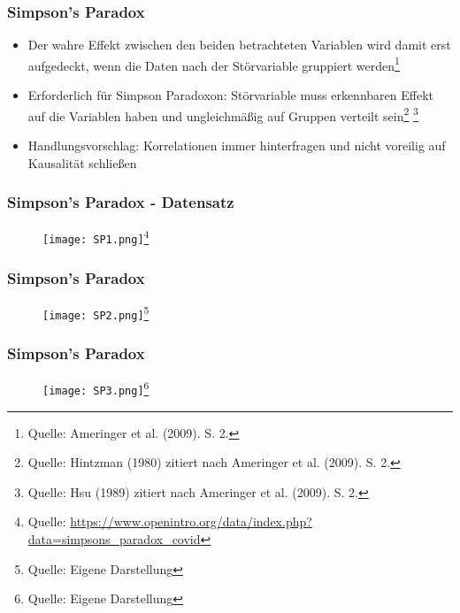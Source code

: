 \documentclass{beamer}
\begin{document}
\begin{frame}
\frametitle{Simpson's Paradox}
\begin{itemize}
    \item Der wahre Effekt zwischen den beiden betrachteten Variablen wird damit erst aufgedeckt, wenn die Daten nach der Störvariable gruppiert werden\footnote{Quelle: {Ameringer et al. (2009). S. 2.}}
    \item Erforderlich für Simpson Paradoxon: Störvariable muss erkennbaren Effekt auf die Variablen haben und ungleichmäßig auf Gruppen verteilt sein\footnote{Quelle: {Hintzman (1980) zitiert nach Ameringer et al. (2009). S. 2.}} \footnote{Quelle: {Hsu (1989) zitiert nach Ameringer et al. (2009). S. 2.}}
    \item Handlungsvorschlag: Korrelationen immer hinterfragen und nicht voreilig auf Kausalität schließen
\end{itemize}
\end{frame}

\begin{frame}
\frametitle{Simpson's Paradox - Datensatz}

\begin{figure}
    \centering
    \texttt{[image: SP1.png]}\footnote{Quelle: \url{https://www.openintro.org/data/index.php?data=simpsons_paradox_covid}}
    
\end{figure}

\end{frame}

\begin{frame}
\frametitle{Simpson's Paradox}

\begin{figure}
    \centering
    \texttt{[image: SP2.png]}\footnote{Quelle: {Eigene Darstellung}}
    
\end{figure}

\end{frame}

\begin{frame}
\frametitle{Simpson's Paradox}

\begin{figure}
    \centering
    \texttt{[image: SP3.png]}\footnote{Quelle: {Eigene Darstellung}}
    
\end{figure}

\end{frame}
\end{document}
